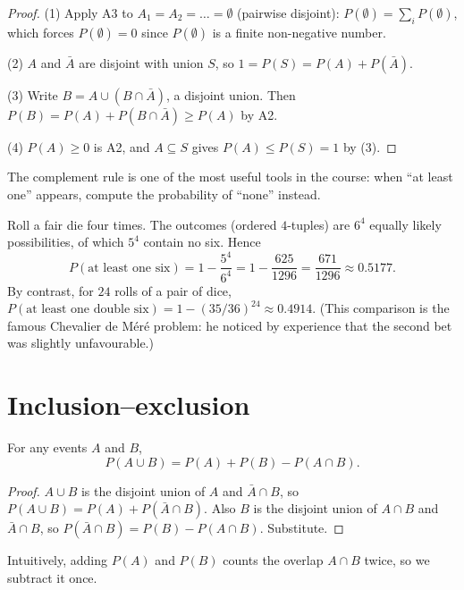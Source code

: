\begin{proof}
(1) Apply A3 to $A_1 = A_2 = \dots = \emptyset$ (pairwise disjoint): $P(\emptyset) =
\sum_{i} P(\emptyset)$, which forces $P(\emptyset) = 0$ since $P(\emptyset)$ is a finite
non-negative number.

(2) $A$ and $\bar A$ are disjoint with union $S$, so $1 = P(S) = P(A) + P(\bar A)$.

(3) Write $B = A \cup (B\cap \bar A)$, a disjoint union. Then
$P(B) = P(A) + P(B \cap \bar A) \ge P(A)$ by A2.

(4) $P(A)\ge 0$ is A2, and $A \subseteq S$ gives $P(A) \le P(S) = 1$ by (3).
\end{proof}

The complement rule is one of the most useful tools in the course: when ``at least one''
appears, compute the probability of ``none'' instead.

\begin{example}
Roll a fair die four times. The outcomes (ordered $4$-tuples) are $6^4$ equally likely
possibilities, of which $5^4$ contain no six. Hence
\[
  P(\text{at least one six}) = 1 - \frac{5^4}{6^4} = 1 - \frac{625}{1296} = \frac{671}{1296}
  \approx 0.5177.
\]
By contrast, for $24$ rolls of a pair of dice, $P(\text{at least one double six}) =
1 - (35/36)^{24} \approx 0.4914$. (This comparison is the famous Chevalier de M\'er\'e
problem: he noticed by experience that the second bet was slightly unfavourable.)
\end{example}

\section{Inclusion--exclusion}

\begin{theorem}
For any events $A$ and $B$,
\[
  P(A \cup B) = P(A) + P(B) - P(A\cap B).
\]
\end{theorem}

\begin{proof}
$A \cup B$ is the disjoint union of $A$ and $\bar A \cap B$, so
$P(A\cup B) = P(A) + P(\bar A\cap B)$. Also $B$ is the disjoint union of $A\cap B$ and
$\bar A \cap B$, so $P(\bar A\cap B) = P(B) - P(A\cap B)$. Substitute.
\end{proof}

Intuitively, adding $P(A)$ and $P(B)$ counts the overlap $A\cap B$ twice, so we subtract
it once.

